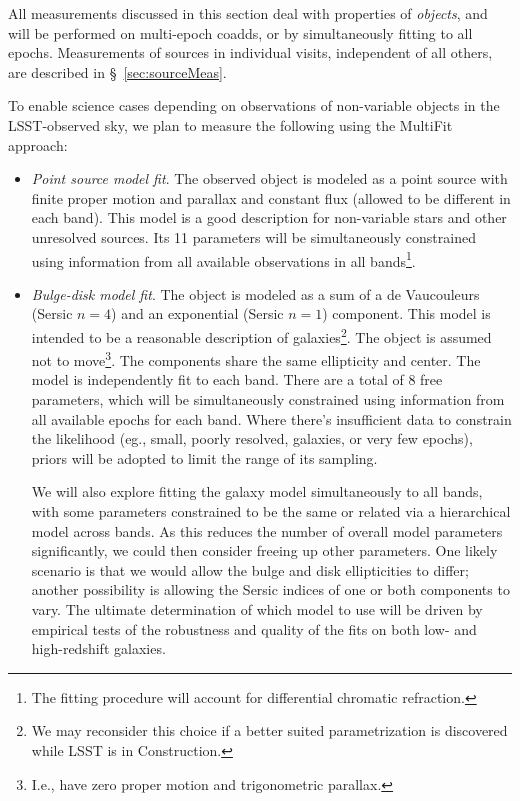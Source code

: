 \documentclass[12pt]{article}
\begin{document}
All measurements discussed in this section deal with properties of {\em objects}, and will be performed on multi-epoch coadds, or by simultaneously fitting to all epochs. Measurements of sources in individual visits, independent of all others, are described in \S~\ref{sec:sourceMeas}.

\vspace{1em}

To enable science cases depending on observations of non-variable objects in the LSST-observed sky, we plan to measure the following using the MultiFit approach:
%
\begin{itemize}
    \item {\em Point source model fit}. The observed object is modeled as a point source with finite proper motion and parallax and constant flux (allowed to be different in each band). This model is a good description for non-variable stars and other unresolved sources. Its 11 parameters will be simultaneously constrained using information from all available observations in all bands\footnote{The fitting procedure will account for differential chromatic refraction.}.
    \item {\em Bulge-disk model fit}. The object is modeled as a sum of a de Vaucouleurs (Sersic $n=4$) and an exponential (Sersic $n=1$) component. This model is intended to be a reasonable description of galaxies\footnote{We may reconsider this choice if a better suited parametrization is discovered while LSST is in Construction.}. The object is assumed not to move\footnote{I.e., have zero proper motion and trigonometric parallax.}. The components share the same ellipticity and center. The model is independently fit to each band. There are a total of 8 free parameters, which will be simultaneously constrained using information from all available epochs for each band. Where there's insufficient data to constrain the likelihood (eg., small, poorly resolved, galaxies, or very few epochs), priors will be adopted to limit the range of its sampling.

We will also explore fitting the galaxy model simultaneously to all bands, with some parameters constrained to be the same or related via a hierarchical model across bands.  As this reduces the number of overall model parameters significantly, we could then consider freeing up other parameters. One likely scenario is that we would allow the bulge and disk ellipticities to differ; another possibility is allowing the Sersic indices of one or both components to vary.  The ultimate determination of which model to use will be driven by empirical tests of the robustness and quality of the fits on both low- and high-redshift galaxies.


\end{itemize}
\end{document}
